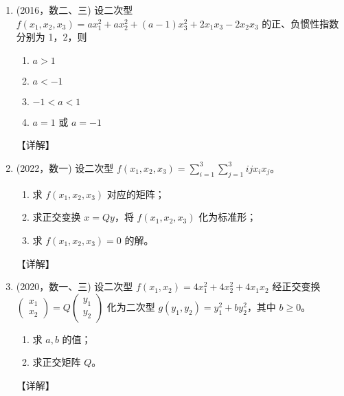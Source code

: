 \documentclass[12pt, a4paper, oneside, UTF8]{ctexbook}
\begin{document}
\begin{enumerate}[label=\arabic*.]
    \item (2016，数二、三) 设二次型 $ f(x_1, x_2, x_3) = a x_1^2 + a x_2^2 + (a-1) x_3^2 + 2 x_1 x_3 - 2 x_2 x_3 $ 的正、负惯性指数分别为 1，2，则
    \begin{enumerate}
        \item  $ a > 1 $
        \item  $ a < -1 $
        \item  $ -1 < a < 1 $
        \item  $ a = 1 $ 或 $ a = -1 $
    \end{enumerate}
    
    \begin{solution}
    【详解】
    \end{solution}
    
    \item (2022，数一) 设二次型 $ f(x_1, x_2, x_3) = \sum_{i=1}^3 \sum_{j=1}^3 i j x_i x_j $。
    \begin{enumerate}
        \item 求 $ f(x_1, x_2, x_3) $ 对应的矩阵；
        \item 求正交变换 $ x = Q y $，将 $ f(x_1, x_2, x_3) $ 化为标准形；
        \item 求 $ f(x_1, x_2, x_3) = 0 $ 的解。
    \end{enumerate}
    
    \begin{solution}
    【详解】
    \end{solution}
    
    \item (2020，数一、三) 设二次型 $ f(x_1, x_2) = 4 x_1^2 + 4 x_2^2 + 4 x_1 x_2 $ 经正交变换 $ \begin{pmatrix} x_1 \\ x_2 \end{pmatrix} = Q \begin{pmatrix} y_1 \\ y_2 \end{pmatrix} $ 化为二次型 $ g(y_1, y_2) = y_1^2 + b y_2^2 $，其中 $ b \geq 0 $。 
    \begin{enumerate}
        \item 求 $ a, b $ 的值；
        \item 求正交矩阵 $ Q $。
    \end{enumerate}
    
    \begin{solution}
    【详解】
    \end{solution}
\end{enumerate}
\end{document}
